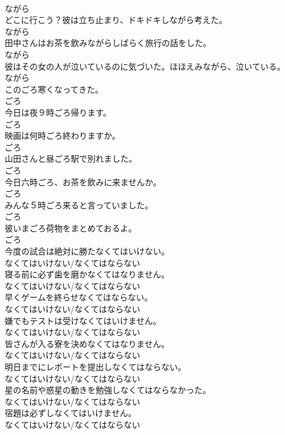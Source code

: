 \documentclass[8pt]{extreport}
\begin{document}
\begin{CJK}{UTF8}{min}
\\	ながら
\\	どこに行こう？彼は立ち止まり、ドキドキしながら考えた。	
\\	ながら
\\	田中さんはお茶を飲みながらしばらく旅行の話をした。	
\\	ながら
\\	彼はその女の人が泣いているのに気づいた。ほほえみながら、泣いている。	
\\	ながら
\\	このごろ寒くなってきた。	
\\	ごろ
\\	今日は夜９時ごろ帰ります。	
\\	ごろ
\\	映画は何時ごろ終わりますか。	
\\	ごろ
\\	山田さんと昼ごろ駅で別れました。	
\\	ごろ
\\	今日六時ごろ、お茶を飲みに来ませんか。	
\\	ごろ
\\	みんな５時ごろ来ると言っていました。	
\\	ごろ
\\	彼いまごろ荷物をまとめておるよ。	
\\	ごろ
\\	今度の試合は絶対に勝たなくてはいけない。	
\\	なくてはいけない/なくてはならない
\\	寝る前に必ず歯を磨かなくてはなりません。	
\\	なくてはいけない/なくてはならない
\\	早くゲームを終らせなくてはならない。	
\\	なくてはいけない/なくてはならない
\\	嫌でもテストは受けなくてはいけません。	
\\	なくてはいけない/なくてはならない
\\	皆さんが入る寮を決めなくてはなりません。	
\\	なくてはいけない/なくてはならない
\\	明日までにレポートを提出しなくてはならない。	
\\	なくてはいけない/なくてはならない
\\	星の名前や惑星の動きを勉強しなくてはならなかった。	
\\	なくてはいけない/なくてはならない
\\	宿題は必ずしなくてはいけません。	
\\	なくてはいけない/なくてはならない

\end{CJK}
\end{document}
